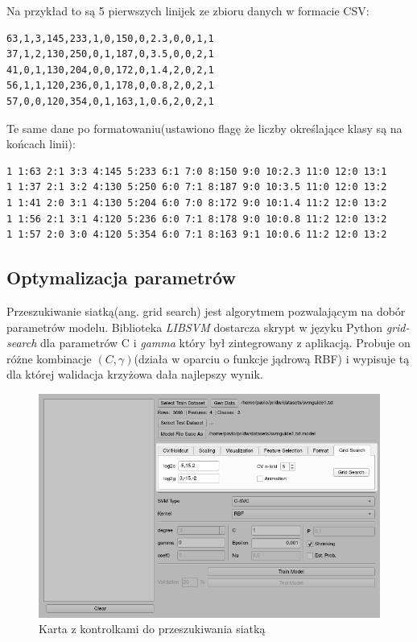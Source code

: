 \documentclass[paper=a4, fontsize=11pt]{scrartcl} %
\numberwithin{equation}{section} %
\numberwithin{figure}{section} %
\begin{document}
    \par Na przykład to są 5 pierwszych linijek ze zbioru danych w formacie CSV:

    \begin{verbatim}
63,1,3,145,233,1,0,150,0,2.3,0,0,1,1
37,1,2,130,250,0,1,187,0,3.5,0,0,2,1
41,0,1,130,204,0,0,172,0,1.4,2,0,2,1
56,1,1,120,236,0,1,178,0,0.8,2,0,2,1
57,0,0,120,354,0,1,163,1,0.6,2,0,2,1
    \end{verbatim}

    \par Te same dane po formatowaniu(ustawiono flagę że liczby określające klasy są na końcach
    linii):

    \begin{verbatim}
1 1:63 2:1 3:3 4:145 5:233 6:1 7:0 8:150 9:0 10:2.3 11:0 12:0 13:1
1 1:37 2:1 3:2 4:130 5:250 6:0 7:1 8:187 9:0 10:3.5 11:0 12:0 13:2
1 1:41 2:0 3:1 4:130 5:204 6:0 7:0 8:172 9:0 10:1.4 11:2 12:0 13:2
1 1:56 2:1 3:1 4:120 5:236 6:0 7:1 8:178 9:0 10:0.8 11:2 12:0 13:2
1 1:57 2:0 3:0 4:120 5:354 6:0 7:1 8:163 9:1 10:0.6 11:2 12:0 13:2
    \end{verbatim}

\subsection{Optymalizacja parametrów}
    \par Przeszukiwanie siatką(ang. grid search) jest algorytmem pozwalającym na dobór
    parametrów modelu. Biblioteka \textit{LIBSVM} dostarcza skrypt w języku Python
    \textit{grid-search} dla parametrów C i \textit{gamma} który był zintegrowany z aplikacją.
    Probuje on różne kombinacje $(C, \gamma)$(działa w oparciu o funkcje jądrową RBF) i
    wypisuje tą dla której walidacja krzyżowa dała najlepszy wynik. 

    \begin{figure}[H]
        \begin{center}
            \includegraphics[scale=0.7]{./img/svm_app_grid_search.png}
            \caption{Karta z kontrolkami do przeszukiwania siatką}
            \label{fig:grid_search}
        \end{center}
    \end{figure}
\end{document}
